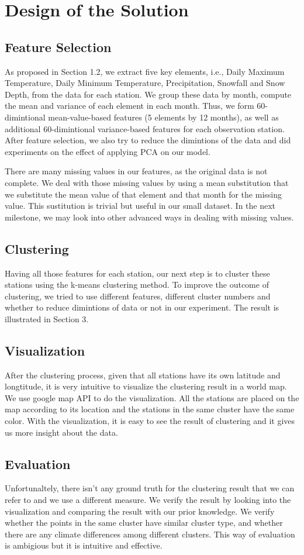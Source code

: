 \section{Design of the Solution}

\subsection{Feature Selection}
As proposed in Section 1.2, we extract five key elements, i.e., Daily Maximum Temperature, Daily Minimum Temperature, Precipitation, Snowfall and Snow Depth, from the data for each station. We group these data by month, compute the mean and variance of each element in each month. Thus, we form 60-dimintional mean-value-based features (5 elements by 12 months), as well as additional 60-dimintional variance-based features for each observation station. After feature selection, we also try to reduce the dimintions of the data and did experiments on the effect of applying PCA on our model.

There are many missing values in our features, as the original data is not complete. We deal with those missing values by using a mean substitution that we substitute the mean value of that element and that month for the missing value. This sustitution is trivial but useful in our small dataset. In the next milestone, we may look into other advanced ways in dealing with missing values.

\subsection{Clustering}
Having all those features for each station, our next step is to cluster these stations using the k-means clustering method. To improve the outcome of clustering, we tried to use different features, different cluster numbers and whether to reduce dimintions of data or not in our experiment. The result is illustrated in Section 3.

\subsection{Visualization}
After the clustering process, given that all stations have its own latitude and longtitude, it is very intuitive to visualize the clustering result in a world map. We use google map API to do the visualization. All the stations are placed on the map according to its location and the stations in the same cluster have the same color. With the visualization, it is easy to see the result of clustering and it gives us more insight about the data.

\subsection{Evaluation}
Unfortunaltely, there isn't any ground truth for the clustering result that we can refer to and we use a different measure. We verify the result by looking into the visualization and comparing the result with our prior knowledge. We verify whether the points in the same cluster have similar cluster type, and whether there are any climate differences among different clusters. This way of evaluation is ambigious but it is intuitive and effective.
